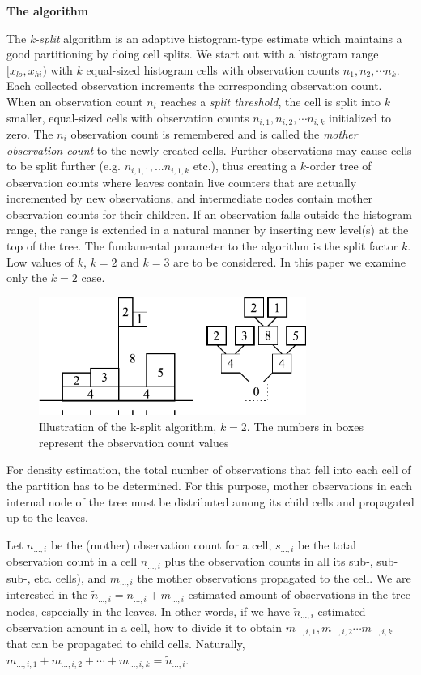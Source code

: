 \textbf{The algorithm}


The \textit{k-split} algorithm is an adaptive histogram-type estimate which
maintains a good partitioning by doing cell splits. We start out with
a histogram range $[x_{lo}, x_{hi})$ with $k$ equal-sized histogram
cells with observation counts $n_1,n_2, \cdots n_k$.  Each collected
observation increments the corresponding observation count. When an
observation count $n_i$ reaches a \textit{split threshold}, the cell
is split into $k$ smaller, equal-sized cells with observation counts
$n_{i,1}, n_{i,2}, \cdots n_{i,k}$ initialized to zero. The $n_i$
observation count is remembered and is called the \textit{mother
  observation count} to the newly created cells. Further observations
may cause cells to be split further (e.g. $n_{i,1,1},...n_{i,1,k}$
etc.), thus creating a $k$-order tree of observation counts where
leaves contain live counters that are actually incremented by new
observations, and intermediate nodes contain mother observation counts
for their children. If an observation falls outside the histogram
range, the range is extended in a natural manner by inserting new
level(s) at the top of the tree. The fundamental parameter to the
algorithm is the split factor $k$. Low values of $k$, $k=2$ and $k=3$
are to be considered. In this paper we examine only the $k=2$ case.

\begin{figure}[htbp]
  \begin{center}
    \includegraphics[width=3.442in, height=1.518in]{figures/usmanFig15}
    \caption{Illustration of the k-split algorithm, $k=2$. The 
      numbers in boxes represent the observation count values}
  \end{center}
\end{figure}


For density estimation, the total number of observations that 
fell into each cell of the partition has to be determined. For 
this purpose, mother observations in each internal node of the 
tree must be distributed among its child cells and propagated 
up to the leaves.


Let $n_{...,i}$ be the (mother) observation count for a cell,
$s_{...,i}$ be the total observation count in a cell $n_{...,i}$ plus
the observation counts in all its sub-, sub-sub-, etc. cells), and
$m_{...,i}$ the mother observations propagated to the cell. We are
interested in the $\tilde{n}_{...,i} = n_{...,i} + m_{...,i}$
estimated amount of observations in the tree nodes, especially in the
leaves. In other words, if we have $\tilde{n}_{...,i}$ estimated
observation amount in a cell, how to divide it to obtain $m_{...,i,1},
m_{...,i,2} \cdots m_{...,i,k}$ that can be propagated to child cells.
Naturally, $m_{...,i,1} + m_{...,i,2} + \cdots + m_{...,i,k} =
\tilde{n}_{...,i}$.


